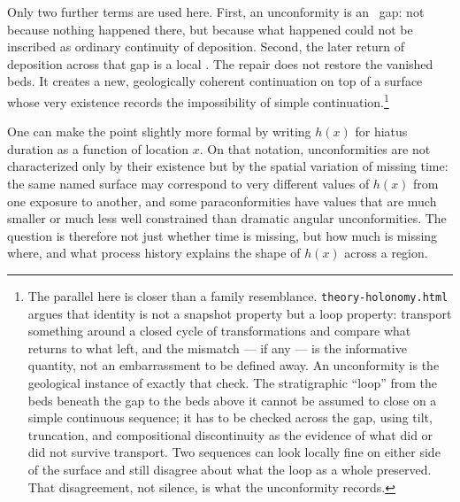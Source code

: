 \documentclass[11pt]{article}
\begin{document}
Only two further terms are used here. First, an unconformity is an \inadmissible\ gap: not because nothing happened there, but because what happened could not be inscribed as ordinary continuity of deposition. Second, the later return of deposition across that gap is a local \repair. The repair does not restore the vanished beds. It creates a new, geologically coherent continuation on top of a surface whose very existence records the impossibility of simple continuation.\footnote{The parallel here is closer than a family resemblance. \texttt{theory-holonomy.html} argues that identity is not a snapshot property but a loop property: transport something around a closed cycle of transformations and compare what returns to what left, and the mismatch --- if any --- is the informative quantity, not an embarrassment to be defined away. An unconformity is the geological instance of exactly that check. The stratigraphic ``loop'' from the beds beneath the gap to the beds above it cannot be assumed to close on a simple continuous sequence; it has to be checked across the gap, using tilt, truncation, and compositional discontinuity as the evidence of what did or did not survive transport. Two sequences can look locally fine on either side of the surface and still disagree about what the loop as a whole preserved. That disagreement, not silence, is what the unconformity records.}

One can make the point slightly more formal by writing $h(x)$ for hiatus duration as a function of location $x$. On that notation, unconformities are not characterized only by their existence but by the spatial variation of missing time: the same named surface may correspond to very different values of $h(x)$ from one exposure to another, and some paraconformities have values that are much smaller or much less well constrained than dramatic angular unconformities. The question is therefore not just whether time is missing, but how much is missing where, and what process history explains the shape of $h(x)$ across a region.
\end{document}
